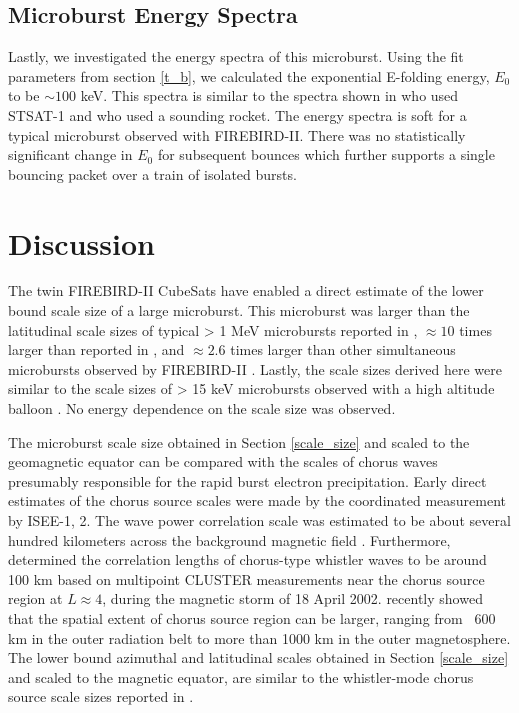 \documentclass[draft, linenumbers]{agujournal}
\begin{document}
\subsection{Microburst Energy Spectra}
Lastly, we investigated the energy spectra of this microburst. Using the fit parameters from section \ref{t_b}, we calculated the exponential E-folding energy, $E_0$ to be $\sim 100$ keV. This spectra is similar to the spectra shown in \citet{Lee2005} who used STSAT-1 and \citet{Datta1997} who used a sounding rocket. The energy spectra is soft for a typical microburst observed with FIREBIRD-II. There was no statistically significant change in $E_0$ for subsequent bounces which further supports a single bouncing packet over a train of isolated bursts.

\section{Discussion} \label{discussion}
The twin FIREBIRD-II CubeSats have enabled a direct estimate of the lower bound scale size of a large microburst. This microburst was larger than the latitudinal scale sizes of typical > 1 MeV microbursts reported in \citet{Blake1996}, $\approx 10$ times larger than reported in \citet{Dietrich2010}, and $\approx 2.6$ times larger than other simultaneous microbursts observed by FIREBIRD-II \citep{Crew2016}. Lastly, the scale sizes derived here were similar to the scale sizes of > 15 keV microbursts observed with a high altitude balloon \citep{Parks1967}. No energy dependence on the scale size was observed.

The microburst scale size obtained in Section \ref{scale_size} and scaled to the geomagnetic equator can be compared with the scales of chorus waves presumably responsible for the rapid burst electron precipitation. Early direct estimates of the chorus source scales were made by the coordinated measurement by ISEE-1, 2. The wave power correlation scale was estimated to be about several hundred kilometers across the background magnetic field \citep{Gurnett1979}. Furthermore, \citet{Santolik2003} determined the correlation lengths of chorus-type whistler waves to be around 100 km based on multipoint CLUSTER  measurements near the chorus source region at $L \approx 4$, during the magnetic storm of 18 April 2002. \citet{Agapitov2010, Agapitov2011b, Agapitov2017a} recently showed that the spatial extent of chorus source region can be larger, ranging from ~600 km in the outer radiation belt to more than 1000 km in the outer magnetosphere. The lower bound azimuthal and latitudinal scales obtained in Section \ref{scale_size} and scaled to the magnetic equator, are similar to the whistler-mode chorus source scale sizes reported in \citet{Agapitov2011b, Agapitov2017a}. 
\end{document}
